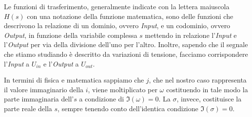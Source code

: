 \documentclass[a4paper, 10pt, final]{article} %
\begin{document}
    Le funzioni di trasferimento, generalmente indicate con la lettera maiuscola $H(s)$ con una notazione della funzione matematica, sono delle funzioni che descrivono la relazione di un dominio, ovvero \emph{Input}, e un codominio, ovvero \emph{Output}, in funzione della variabile complessa $s$ mettendo in relazione l'\emph{Input} e l'\emph{Output} per via della divisione dell'uno per l'altro.
    Inoltre, sapendo che il segnale che stiamo studiando \`{e} descritto da variazioni di tensione, facciamo corrispondere l'\emph{Input} a $U_{in}$ e l'\emph{Output} a $U_{out}$.

    In termini di fisica e matematica sappiamo che $j$, che nel nostro caso rappresenta il valore immaginario della \(i\), viene moltiplicato per $\omega$ costituendo in tale modo la parte immaginaria dell'$s$ a condizione di $\Im(\omega) = 0$.
    La \(\sigma\), invece, costituisce la parte reale della \(s\), sempre tenendo conto dell'identica condizione $\Im(\sigma) = 0$.
\end{document}

